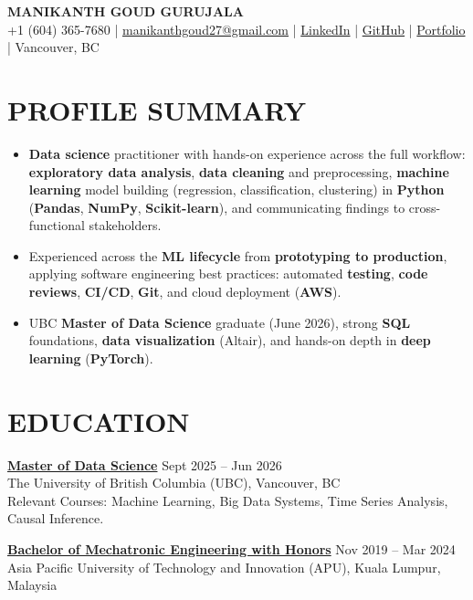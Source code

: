 \documentclass[10pt,a4paper]{article}
\begin{document}
\begin{center}
    {\LARGE \textbf{MANIKANTH GOUD GURUJALA}}\\[6pt]
    +1 (604) 365-7680 | \href{mailto:manikanthgoud27@gmail.com}{manikanthgoud27@gmail.com} |
    \href{https://www.linkedin.com/in/gurujala-manikanth-goud/}{LinkedIn} |
    \href{https://github.com/goudmani}{GitHub} |
    \href{https://goudmani.github.io/porfolio/}{Portfolio} |
    Vancouver, BC
\end{center}

\section*{PROFILE SUMMARY}
\begin{itemize}[leftmargin=*, itemsep=1pt, topsep=1pt]
    \item \textbf{Data science} practitioner with hands-on experience across the full workflow:
    \textbf{exploratory data analysis}, \textbf{data cleaning} and preprocessing, \textbf{machine
    learning} model building (regression, classification, clustering) in \textbf{Python}
    (\textbf{Pandas}, \textbf{NumPy}, \textbf{Scikit-learn}), and communicating findings to
    cross-functional stakeholders.
    \item Experienced across the \textbf{ML lifecycle} from \textbf{prototyping to production},
    applying software engineering best practices: automated \textbf{testing}, \textbf{code
    reviews}, \textbf{CI/CD}, \textbf{Git}, and cloud deployment (\textbf{AWS}).
    \item UBC \textbf{Master of Data Science} graduate (June 2026), strong \textbf{SQL}
    foundations, \textbf{data visualization} (Altair), and hands-on depth in \textbf{deep
    learning} (\textbf{PyTorch}).
\end{itemize}

\section*{EDUCATION}

\textbf{\href{https://masterdatascience.ubc.ca/programs/vancouver}{Master of Data Science}} \hfill \small{Sept 2025 -- Jun 2026}\\
The University of British Columbia (UBC), Vancouver, BC \\
Relevant Courses: Machine Learning, Big Data Systems, Time Series Analysis, Causal Inference.

\textbf{\href{https://www.apu.edu.my/course/bachelor-of-mechatronic-engineering}{Bachelor of Mechatronic Engineering with Honors}} \hfill \small{Nov 2019 -- Mar 2024}\\
Asia Pacific University of Technology and Innovation (APU), Kuala Lumpur, Malaysia
\end{document}
